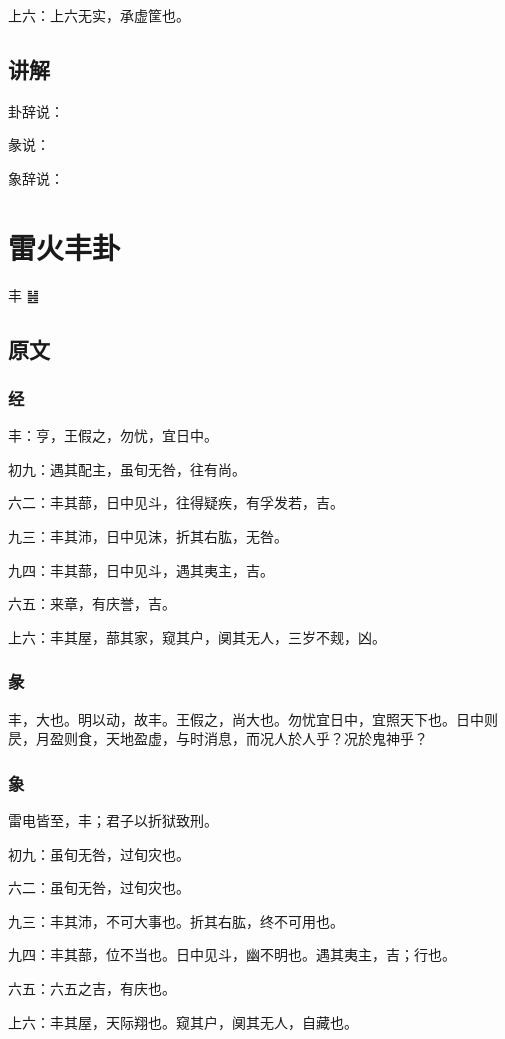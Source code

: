 \documentclass[12pt,oneside]{book}
\begin{document}
上六：上六无实，承虚筐也。

\section{讲解}
卦辞说：

彖说：

象辞说：

\chapter{雷火丰卦}
丰 {\Large ䷶}

\section{原文}

\subsection{经}
丰：亨，王假之，勿忧，宜日中。

初九：遇其配主，虽旬无咎，往有尚。

六二：丰其蔀，日中见斗，往得疑疾，有孚发若，吉。

九三：丰其沛，日中见沫，折其右肱，无咎。

九四：丰其蔀，日中见斗，遇其夷主，吉。

六五：来章，有庆誉，吉。

上六：丰其屋，蔀其家，窥其户，阒其无人，三岁不觌，凶。

\subsection{彖}
丰，大也。明以动，故丰。王假之，尚大也。勿忧宜日中，宜照天下也。日中则昃，月盈则食，天地盈虚，与时消息，而况人於人乎？况於鬼神乎？

\subsection{象}
雷电皆至，丰；君子以折狱致刑。

初九：虽旬无咎，过旬灾也。

六二：虽旬无咎，过旬灾也。

九三：丰其沛，不可大事也。折其右肱，终不可用也。

九四：丰其蔀，位不当也。日中见斗，幽不明也。遇其夷主，吉；行也。

六五：六五之吉，有庆也。

上六：丰其屋，天际翔也。窥其户，阒其无人，自藏也。
\end{document}
